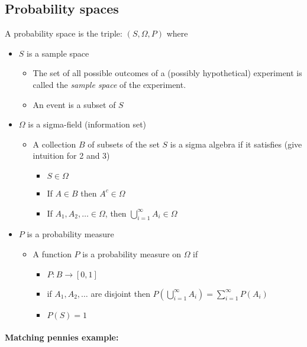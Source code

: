 \subsection{Probability spaces}

     A probability space is the triple: $(S, \Omega, P)$ where
\begin{itemize}
\item $S$ is a sample space
\begin{itemize}
\item The set of all possible outcomes of a (possibly hypothetical)
         experiment is called the \emph{sample space} of the experiment.
\item An event is a subset of $S$
\end{itemize}
\item $\Omega$ is a sigma-field (information set)
\begin{itemize}
\item A collection $B$ of subsets of the set $S$ is a sigma
         algebra if it satisfies (give intuition for 2 and 3)
\begin{itemize}
\item $S \in  \Omega$
\item If $A \in  B$ then $A^c \in  \Omega$
\item If $A_1, A_2, \dots \in  \Omega$, then $\bigcup_{i=1}^\infty A_i
           \in  \Omega$
\end{itemize}
\end{itemize}
\item $P$ is a probability measure
\begin{itemize}
\item A function $P$ is a probability measure on $\Omega$ if
\begin{itemize}
\item $P:  B \to [0,1]$
\item if $A_1,A_2,\dots$ are disjoint then $P(\bigcup_{i=1}^\infty
           A_i) = \sum_{i=1}^\infty P(A_i)$
\item $P(S) = 1$
\end{itemize}
\end{itemize}
\end{itemize}

\paragraph{Matching pennies example:}

